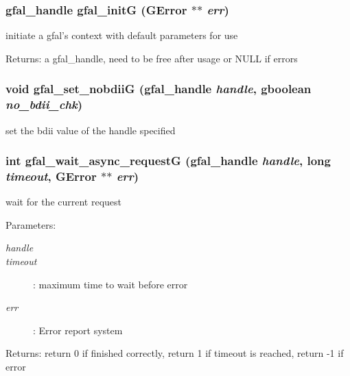\subsubsection{\setlength{\rightskip}{0pt plus 5cm}gfal\_\-handle gfal\_\-init\-G (GError $\ast$$\ast$ {\em err})}\label{gfal__common__srm_8h_8410ba458f920d8f8a8f0e5594170fe4}


initiate a gfal's context with default parameters for use \begin{Desc}
\item[Returns:]a gfal\_\-handle, need to be free after usage or NULL if errors \end{Desc}
\subsubsection{\setlength{\rightskip}{0pt plus 5cm}void gfal\_\-set\_\-nobdii\-G (gfal\_\-handle {\em handle}, gboolean {\em no\_\-bdii\_\-chk})}\label{gfal__common__srm_8h_a3975dda72e623713566e510b0317796}


set the bdii value of the handle specified 
\subsubsection{\setlength{\rightskip}{0pt plus 5cm}int gfal\_\-wait\_\-async\_\-request\-G (gfal\_\-handle {\em handle}, long {\em timeout}, GError $\ast$$\ast$ {\em err})}\label{gfal__common__srm_8h_86890a00f72d9af9ab88f42a69e3bf8c}


wait for the current request 

\begin{Desc}
\item[Parameters:]
\begin{description}
\item[{\em handle}]\item[{\em timeout}]: maximum time to wait before error \item[{\em err}]: Error report system \end{description}
\end{Desc}
\begin{Desc}
\item[Returns:]return 0 if finished correctly, return 1 if timeout is reached, return -1 if error \end{Desc}
